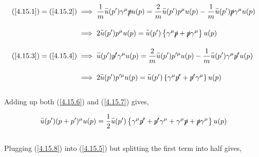 \begin{solution}
\begin{align}
    (\ref{4.15.1}) = (\ref{4.15.2}) &\implies \frac{1}{m}  \overbar{u}(p')\gamma^\mu \slashed{p} u(p) = \frac{2}{m}  \overbar{u}(p') p^\mu  u(p) - \frac{1}{m}  \overbar{u}(p') \slashed{p} \gamma^\mu   u(p) \nonumber \\[0.15in]
                                    &\implies 2 \overbar{u}(p') p^\mu  u(p) = \overbar{u}(p') \left\{ \gamma^\mu \slashed{p} + \slashed{p}\gamma^\mu \right\} u(p)  \label{4.15.6} \\[0.15in]
    (\ref{4.15.3}) = (\ref{4.15.4}) &\implies  \overbar{u}(p')  \slashed{p'} \gamma^\mu u(p)  = \frac{2}{m}  \overbar{u}(p') p'^\mu  u(p) - \frac{1}{m}  \overbar{u}(p') \gamma^\mu   \slashed{p'} u(p)    \nonumber \\[0.15in]
                                    &\implies 2 \overbar{u}(p') p'^\mu  u(p) = \overbar{u}(p') \left\{ \gamma^\mu \slashed{p'} + \slashed{p'}\gamma^\mu \right\} u(p)   \label{4.15.7}
\end{align}\\
Adding up both (\ref{4.15.6}) and (\ref{4.15.7}) gives, 

\begin{align}
    \overbar{u}(p') (p+p')^\mu  u(p) = \frac{1}{2} \overbar{u}(p') \left\{ \gamma^\mu \slashed{p'} + \slashed{p'}\gamma^\mu + \gamma^\mu \slashed{p} + \slashed{p}\gamma^\mu \right\} u(p) \label{4.15.8}
\end{align}\\
Plugging (\ref{4.15.8}) into (\ref{4.15.5}) but splitting the first term into half gives, 


\end{solution}
